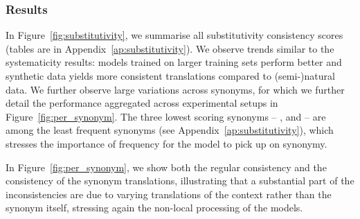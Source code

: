 \subsubsection{Results}
In Figure~\ref{fig:substitutivity}, we summarise all substitutivity consistency scores (tables are in Appendix~\ref{ap:substitutivity}).
We observe trends similar to the systematicity results: models trained on larger training sets perform better and synthetic data yields more consistent translations compared to (semi-)natural data.
We further observe large variations across synonyms, for which we further detail the performance aggregated across experimental setups in Figure~\ref{fig:per_synonym}.
The three lowest scoring synonyms -- ,  and  -- are among the least frequent synonyms (see Appendix~\ref{ap:substitutivity}), which stresses the importance of frequency for the model to pick up on synonymy.

In Figure~\ref{fig:per_synonym}, we show both the regular consistency and the consistency of the synonym translations, illustrating that a substantial part of the inconsistencies are due to varying translations of the context rather than the synonym itself, stressing again the non-local processing of the models.